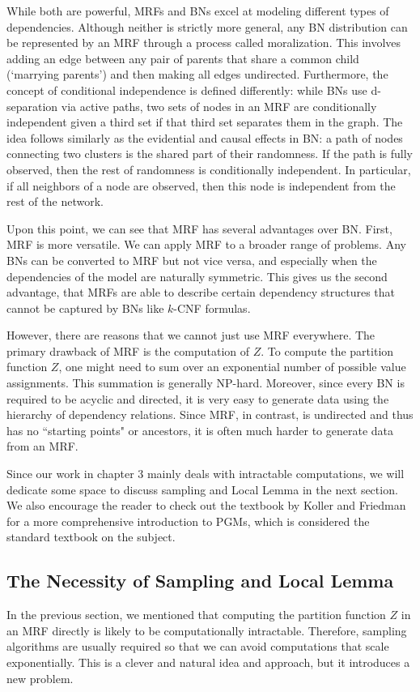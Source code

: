 While both are powerful, MRFs and BNs excel at modeling different types of
dependencies. Although neither is strictly more general, any BN distribution
can be represented by an MRF through a process called moralization. This
involves adding an edge between any pair of parents that share a common child
(`marrying parents') and then making all edges undirected. Furthermore, the
concept of conditional independence is defined differently: while BNs use
d-separation via active paths, two sets of nodes in an MRF are conditionally
independent given a third set if that third set separates them in the graph.
The idea follows similarly as the evidential and causal effects in BN: a path
of nodes connecting two clusters is the shared part of their randomness. If the
path is fully observed, then the rest of randomness is conditionally
independent. In particular, if all neighbors of a node are observed, then this
node is independent from the rest of the network.

Upon this point, we can see that MRF has several advantages over BN. First, MRF
is more versatile. We can apply MRF to a broader range of problems. Any BNs can
be converted to MRF but not vice versa, and especially when the dependencies of
the model are naturally symmetric. This gives us the second advantage, that
MRFs are able to describe certain dependency structures that cannot be captured
by BNs like $k$-CNF formulas.

However, there are reasons that we cannot just use MRF everywhere. The primary
drawback of MRF is the computation of $Z$. To compute the partition function
$Z$, one might need to sum over an exponential number of possible value
assignments. This summation is generally NP-hard. Moreover, since every BN is
required to be acyclic and directed, it is very easy to generate data using the
hierarchy of dependency relations. Since MRF, in contrast, is undirected and
thus has no ``starting points" or ancestors, it is often much harder to
generate data from an MRF.

Since our work in chapter 3 mainly deals with intractable computations, we will
dedicate some space to discuss sampling and \lovasz Local Lemma in the next
section. We also encourage the reader to check out the textbook by Koller and
Friedman \cite{koller2009probabilistic} for a more comprehensive introduction
to PGMs, which is considered the standard textbook on the subject.

\subsection{The Necessity of Sampling and \lovasz Local Lemma} \label{intro_chap:sec:MRF:sec:sampling}
In the previous section, we mentioned that computing the partition function $Z$
in an MRF directly is likely to be computationally intractable. Therefore,
sampling algorithms are usually required so that we can avoid computations that
scale exponentially. This is a clever and natural idea and approach, but it
introduces a new problem.

